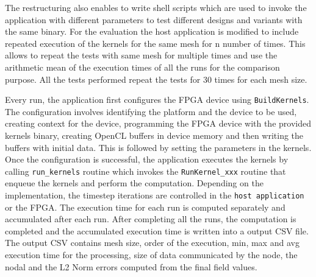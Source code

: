 The restructuring also enables to write shell scripts which are
used to invoke the application with different parameters to test different
designs and variants with the same binary. For the evaluation the host
application is modified to include repeated execution of the kernels for the
same mesh for n number of times. This allows to repeat the tests with
same mesh for multiple times and use the arithmetic mean of the execution times
of all the runs for the comparison purpose. All the tests performed repeat
the tests for 30 times for each mesh size.

Every run, the application first configures the FPGA device using \texttt{BuildKernels}.
The configuration involves identifying the platform and the device to be used, creating
context for the device, programming the FPGA device with the provided kernels binary,
creating OpenCL buffers in device memory and then writing the buffers with initial data.
This is followed by setting the parameters in the kernels. Once the configuration is successful,
the application executes the kernels by calling \texttt{run\_kernels} routine which invokes the
\texttt{RunKernel\_xxx} routine that enqueue the kernels and perform the computation. Depending
on the implementation, the timestep iterations are controlled in the \texttt{host application} or the FPGA.
The execution time for each run is computed separately and accumulated after each run. After completing
all the runs, the computation is completed and the accumulated execution time is written into a
output CSV file. The output CSV contains mesh size,
order of the execution, min, max and avg execution time for the processing, size
of data communicated by the node, the nodal and the L2 Norm errors computed from the
final field values.

